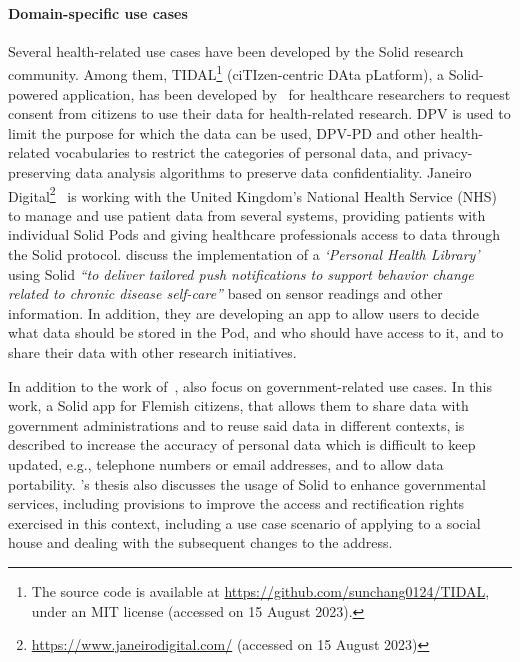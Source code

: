 \paragraph{Domain-specific use cases}
Several health-related use cases have been developed by the Solid research community.
Among them, TIDAL\footnote{The source code is available at \url{https://github.com/sunchang0124/TIDAL}, under an MIT license (accessed on 15 August 2023).} (ciTIzen-centric DAta pLatform), a Solid-powered application, has been developed by~\cite{sun_citizen-centric_2023} for healthcare researchers to request consent from citizens to use their data for health-related research. DPV is used to limit the purpose for which the data can be used, DPV-PD and other health-related vocabularies to restrict the categories of personal data, and privacy-preserving data analysis algorithms to preserve data confidentiality.
Janeiro Digital\footnote{\url{https://www.janeirodigital.com/} (accessed on 15 August 2023)}~\citeyearpar{noauthor_janeiro_nodate} is working with the United Kingdom's National Health Service (NHS) to manage and use patient data from several systems, providing patients with individual Solid Pods and giving healthcare professionals access to data through the Solid protocol.
\cite{ammar_personal_2020,ammar_using_2021} discuss the implementation of a \textit{`Personal Health Library'} using Solid \textit{``to deliver tailored push notifications to support behavior change related to chronic disease self-care''} based on sensor readings and other information.
In addition, they are developing an app to allow users to decide what data should be stored in the Pod, and who should have access to it, and to share their data with other research initiatives.

In addition to the work of~\cite{de_bot_data_2021}, \cite{chugunov_streamlining_2020} also focus on government-related use cases. In this work, a Solid app for Flemish citizens, that allows them to share data with government administrations and to reuse said data in different contexts, is described to increase the accuracy of personal data which is difficult to keep updated, e.g., telephone numbers or email addresses, and to allow data portability.
\citeauthor{wang_enhancing_2020}'s thesis also discusses the usage of Solid to enhance governmental services, including provisions to improve the access and rectification rights exercised in this context, including a use case scenario of applying to a social house and dealing with the subsequent changes to the address. 

